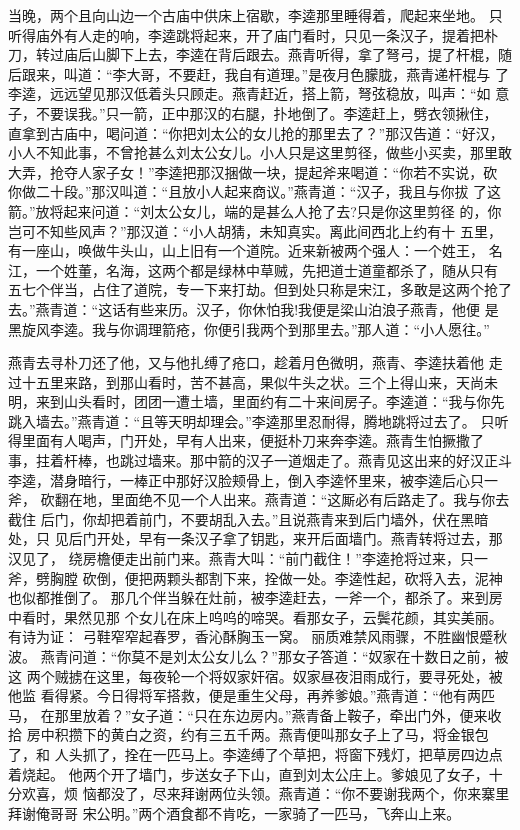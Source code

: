 当晚，两个且向山边一个古庙中供床上宿歇，李逵那里睡得着，爬起来坐地。
只听得庙外有人走的响，李逵跳将起来，开了庙门看时，只见一条汉子，提着把朴
刀，转过庙后山脚下上去，李逵在背后跟去。燕青听得，拿了弩弓，提了杆棍，随
后跟来，叫道：“李大哥，不要赶，我自有道理。”是夜月色朦胧，燕青递杆棍与
了李逵，远远望见那汉低着头只顾走。燕青赶近，搭上箭，弩弦稳放，叫声：“如
意子，不要误我。”只一箭，正中那汉的右腿，扑地倒了。李逵赶上，劈衣领揪住，
直拿到古庙中，喝问道：“你把刘太公的女儿抢的那里去了？”那汉告道：“好汉，
小人不知此事，不曾抢甚么刘太公女儿。小人只是这里剪径，做些小买卖，那里敢
大弄，抢夺人家子女！”李逵把那汉捆做一块，提起斧来喝道：“你若不实说，砍
你做二十段。”那汉叫道：“且放小人起来商议。”燕青道：“汉子，我且与你拔
了这箭。”放将起来问道：“刘太公女儿，端的是甚么人抢了去?只是你这里剪径
的，你岂可不知些风声？”那汉道：“小人胡猜，未知真实。离此间西北上约有十
五里，有一座山，唤做牛头山，山上旧有一个道院。近来新被两个强人：一个姓王，
名江，一个姓董，名海，这两个都是绿林中草贼，先把道士道童都杀了，随从只有
五七个伴当，占住了道院，专一下来打劫。但到处只称是宋江，多敢是这两个抢了
去。”燕青道：“这话有些来历。汉子，你休怕我!我便是梁山泊浪子燕青，他便
是黑旋风李逵。我与你调理箭疮，你便引我两个到那里去。”那人道：“小人愿往。”

燕青去寻朴刀还了他，又与他扎缚了疮口，趁着月色微明，燕青、李逵扶着他
走过十五里来路，到那山看时，苦不甚高，果似牛头之状。三个上得山来，天尚未
明，来到山头看时，团团一遭土墙，里面约有二十来间房子。李逵道：“我与你先
跳入墙去。”燕青道：“且等天明却理会。”李逵那里忍耐得，腾地跳将过去了。
只听得里面有人喝声，门开处，早有人出来，便挺朴刀来奔李逵。燕青生怕撅撒了
事，拄着杆棒，也跳过墙来。那中箭的汉子一道烟走了。燕青见这出来的好汉正斗
李逵，潜身暗行，一棒正中那好汉脸颊骨上，倒入李逵怀里来，被李逵后心只一斧，
砍翻在地，里面绝不见一个人出来。燕青道：“这厮必有后路走了。我与你去截住
后门，你却把着前门，不要胡乱入去。”且说燕青来到后门墙外，伏在黑暗处，只
见后门开处，早有一条汉子拿了钥匙，来开后面墙门。燕青转将过去，那汉见了，
绕房檐便走出前门来。燕青大叫：“前门截住！”李逵抢将过来，只一斧，劈胸膛
砍倒，便把两颗头都割下来，拴做一处。李逵性起，砍将入去，泥神也似都推倒了。
那几个伴当躲在灶前，被李逵赶去，一斧一个，都杀了。来到房中看时，果然见那
个女儿在床上呜呜的啼哭。看那女子，云鬓花颜，其实美丽。有诗为证：
弓鞋窄窄起春罗，香沁酥胸玉一窝。
丽质难禁风雨骤，不胜幽恨蹙秋波。
燕青问道：“你莫不是刘太公女儿么？”那女子答道：“奴家在十数日之前，被这
两个贼掳在这里，每夜轮一个将奴家奸宿。奴家昼夜泪雨成行，要寻死处，被他监
看得紧。今日得将军搭救，便是重生父母，再养爹娘。”燕青道：“他有两匹马，
在那里放着？”女子道：“只在东边房内。”燕青备上鞍子，牵出门外，便来收拾
房中积攒下的黄白之资，约有三五千两。燕青便叫那女子上了马，将金银包了，和
人头抓了，拴在一匹马上。李逵缚了个草把，将窗下残灯，把草房四边点着烧起。
他两个开了墙门，步送女子下山，直到刘太公庄上。爹娘见了女子，十分欢喜，烦
恼都没了，尽来拜谢两位头领。燕青道：“你不要谢我两个，你来寨里拜谢俺哥哥
宋公明。”两个酒食都不肯吃，一家骑了一匹马，飞奔山上来。


